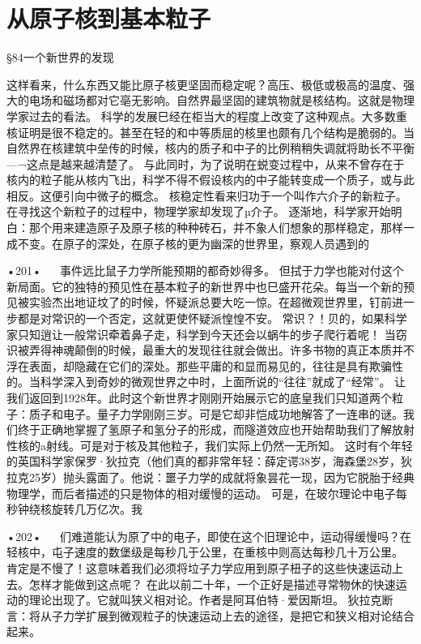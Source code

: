 \chapter{从原子核到基本粒子}

§84一个新世界的发现

这样看来，什么东西又能比原子核更坚固而稳定呢？高压、极低或极高的温度、强大的电场和磁场都对它亳无影响。自然界最坚固的建筑物就是核结构。这就是物理学家过去的看法。
科学的发展巳经在柜当大的程度上改变了这种观点。大多数重核证明是很不稳定的。甚至在轻的和中等质屈的核里也颇有几个结构是脆弱的。当自然界在核建筑中垒传的时候，核内的质子和中子的比例稍稍失调就将助长不平衡—¬这点是越来越清楚了。
与此同时，为了说明在蜕变过程中，从来不曾存在于核内的粒子能从核内飞出，科学不得不假设核内的中子能转变成一个质子，或与此相反。这便引向中微子的概念。
核稳定性看来归功于一个叫作六介子的新粒子。在寻找这个新粒子的过程中，物理学家却发现了µ介子。
逐渐地，科学家开始明白：那个用来建造原子及原子核的种种砖石，并不象人们想象的那样稳定，那样一成不变。在原子的深处，在原子核的更为幽深的世界里，察观人员遇到的

•201•
  
事件远比鼠子力学所能预期的都奇妙得多。
但拭于力学也能对付这个新局面。它的独特的预见性在基本粒子的新世界中也巳盛开花朵。每当一个新的预见被实验杰出地证坟了的时候，怀疑派总要大吃一惊。在超微观世界里，钉前进一步都是对常识的一个否定，这就更使怀疑派惶惶不安。
常识？！贝的，如果科学家只知逍让一般常识牵着鼻子走，科学到今天还会以蜗牛的步子爬行着呢！
当窃识被弄得神魂颠倒的时候，最重大的发现往往就会做出。许多书物的真正本质并不浮在表面，却隐藏在它们的深处。那些平庸的和显而易见的，往往是具有欺骗性的。当科学深入到奇妙的微观世界之中时，上面所说的“往往”就成了“经常”。
让我们返回到1928年。此时这个新世界才刚刚开始展示它的底皇我们只知道两个粒子：质子和电子。量子力学刚刚三岁。可是它却非恺成功地解答了一连串的谜。我们终于正确地掌握了氢原子和氢分子的形成，而隧道效应也开始帮助我们了解放射性核的a射线。可是对于核及其他粒子，我们实际上仍然一无所知。
这时有个年轻的英国科学家保罗·狄拉克（他们真的都非常年轻：薛定谔38岁，海森堡28岁，狄拉克25岁）抛头露面了。他说：噩子力学的成就将象昙花一现，因为它脱胎于经典物理学，而后者描述的只是物体的相对缓慢的运动。
可是，在玻尔理论中电子每秒钟绕核旋转几万亿次。我

•202•
  
们难道能认为原了中的电子，即使在这个旧理论中，运动得缓慢吗？在轻核中，屯子速度的数堡级是每秒几于公里，在重核中则高达每秒几十万公里。
肯定是不慢了！这意味着我们必须将垃子力学应用到原子杻子的这些快速运动上去。怎样才能做到这点呢？
在此以前二十年，一个正好是描述寻常物休的快速运动的理论出现了。它就叫狭义相对论。作者是阿耳伯特·爱因斯坦。
狄拉克断言：将从子力学扩展到微观粒子的快速运动上去的途径，是把它和狭义相对论结合起来。

